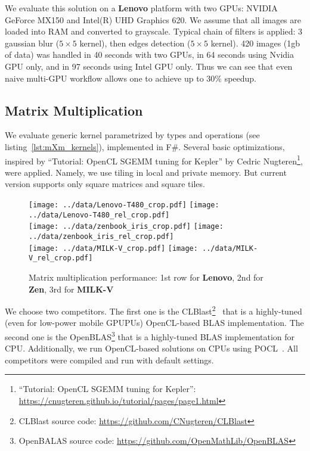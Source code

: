 We evaluate this solution on a \textbf{Lenovo} platform with two GPUs: NVIDIA GeForce MX150 and Intel(R) UHD Graphics 620.
We assume that all images are loaded into RAM and converted to grayscale. 
Typical chain of filters is applied: 3 gaussian blur ($5 \times 5$ kernel), then edges detection ($5 \times 5$ kernel).
420 images (1gb of data) was handled in 40 seconds with two GPUs, in 64 seconds using Nvidia GPU only, and in 97 seconds using Intel GPU only.
Thus we can see that even naive multi-GPU workflow allows one to achieve up to 30\% speedup.

\subsection{Matrix Multiplication}

We evaluate generic kernel parametrized by types and operations (see listing~\ref{lst:mXm_kernels}), implemented in F\#.
Several basic optimizations, inspired by ``Tutorial: OpenCL SGEMM tuning for Kepler'' by Cedric Nugteren\footnote{``Tutorial: OpenCL SGEMM tuning for Kepler'': \url{https://cnugteren.github.io/tutorial/pages/page1.html}}, were applied.
Namely, we use tiling in local and private memory.
But current version supports only square matrices and square tiles.

\begin{figure}
  \begin{center}
  \texttt{[image: ../data/Lenovo-T480\_crop.pdf]}
  \texttt{[image: ../data/Lenovo-T480\_rel\_crop.pdf]}\\
  \texttt{[image: ../data/zenbook\_iris\_crop.pdf]}
  \texttt{[image: ../data/zenbook\_iris\_rel\_crop.pdf]}\\
  \texttt{[image: ../data/MILK-V\_crop.pdf]}
  \texttt{[image: ../data/MILK-V\_rel\_crop.pdf]}
  \end{center}
  \caption{Matrix multiplication performance: 1st row for \textbf{Lenovo}, 2nd for \textbf{Zen}, 3rd for \textbf{MILK-V}}
  \label{fig:mxm_perf}
\end{figure}

We choose two competitors.
The first one is the CLBlast\footnote{CLBlast source code: \url{https://github.com/CNugteren/CLBlast}}~\cite{10.1145/3204919.3204924} that is a highly-tuned (even for low-power mobile GPUPUs) OpenCL-based BLAS implementation.
The second one is the OpenBLAS\footnote{OpenBALAS source code: \url{https://github.com/OpenMathLib/OpenBLAS}} that is a highly-tuned BLAS implementation for CPU.
Additionally, we run OpenCL-based solutions on CPUs using POCL~\cite{Jskelinen2014}.
All competitors were compiled and run with default settings.


